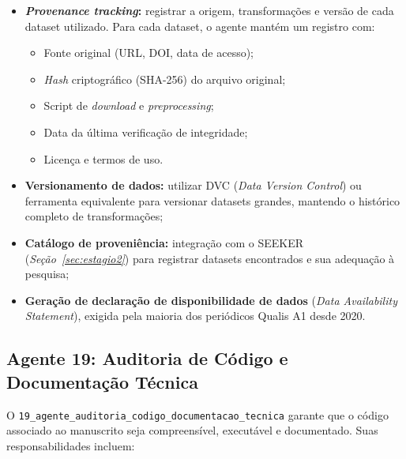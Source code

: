 \begin{itemize}
    \item \textbf{\textit{Provenance tracking}:} registrar a origem,
    transformações e versão de cada dataset utilizado. Para cada
    dataset, o agente mantém um registro com:

    \begin{itemize}
        \item Fonte original (URL, DOI, data de acesso);

        \item \textit{Hash} criptográfico (SHA-256) do arquivo
        original;

        \item Script de \textit{download} e \textit{preprocessing};

        \item Data da última verificação de integridade;

        \item Licença e termos de uso.
    \end{itemize}

    \item \textbf{Versionamento de dados:} utilizar DVC
    (\textit{Data Version Control}) ou ferramenta equivalente para
    versionar datasets grandes, mantendo o histórico completo de
    transformações;

    \item \textbf{Catálogo de proveniência:} integração com o
    SEEKER (\textit{Seção~\ref{sec:estagio2}}) para registrar
    datasets encontrados e sua adequação à pesquisa;

    \item \textbf{Geração de declaração de disponibilidade de
    dados} (\textit{Data Availability Statement}), exigida pela
    maioria dos periódicos Qualis A1 desde 2020.
\end{itemize}

\subsection{Agente 19: Auditoria de Código e Documentação Técnica}
\label{sec:agente19}

O \texttt{19\_agente\_auditoria\_codigo\_documentacao\_tecnica}
garante que o código associado ao manuscrito seja compreensível,
executável e documentado. Suas responsabilidades incluem:

